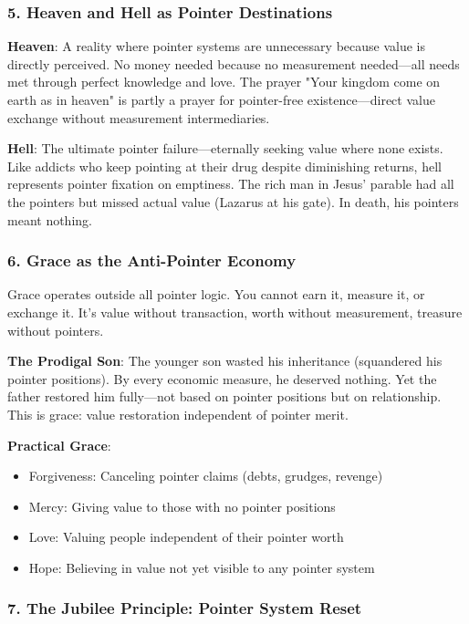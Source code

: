 \documentclass[11pt,oneside]{book}
\begin{document}
{{{{{{\subsubsection{5. Heaven and Hell as Pointer Destinations}

\textbf{Heaven}: A reality where pointer systems are unnecessary because value is directly perceived. No money needed because no measurement needed—all needs met through perfect knowledge and love. The prayer "Your kingdom come on earth as in heaven" is partly a prayer for pointer-free existence—direct value exchange without measurement intermediaries.

\textbf{Hell}: The ultimate pointer failure—eternally seeking value where none exists. Like addicts who keep pointing at their drug despite diminishing returns, hell represents pointer fixation on emptiness. The rich man in Jesus' parable had all the pointers but missed actual value (Lazarus at his gate). In death, his pointers meant nothing.

\subsubsection{6. Grace as the Anti-Pointer Economy}

Grace operates outside all pointer logic. You cannot earn it, measure it, or exchange it. It's value without transaction, worth without measurement, treasure without pointers.

\textbf{The Prodigal Son}: The younger son wasted his inheritance (squandered his pointer positions). By every economic measure, he deserved nothing. Yet the father restored him fully—not based on pointer positions but on relationship. This is grace: value restoration independent of pointer merit.

\textbf{Practical Grace}:
\begin{itemize}
\item Forgiveness: Canceling pointer claims (debts, grudges, revenge)
\item Mercy: Giving value to those with no pointer positions
\item Love: Valuing people independent of their pointer worth
\item Hope: Believing in value not yet visible to any pointer system
\end{itemize}

\subsubsection{7. The Jubilee Principle: Pointer System Reset}

}}}}}}
\end{document}

